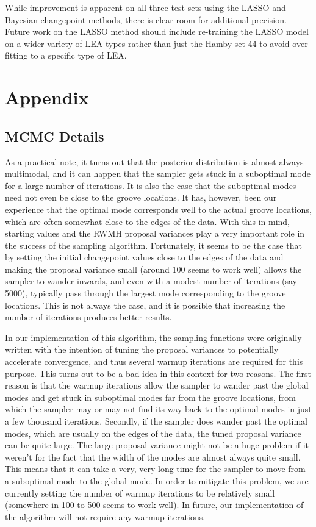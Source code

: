 \documentclass[12pt]{article}
\begin{document}
While improvement is apparent on all three test sets using the LASSO and
Bayesian changepoint methods, there is clear room for additional
precision. Future work on the LASSO method should include re-training
the LASSO model on a wider variety of LEA types rather than just the
Hamby set 44 to avoid over-fitting to a specific type of LEA.

\section{Appendix}

\subsection{MCMC Details}

As a practical note, it turns out that the posterior distribution is
almost always multimodal, and it can happen that the sampler gets stuck
in a suboptimal mode for a large number of iterations. It is also the
case that the suboptimal modes need not even be close to the groove
locations. It has, however, been our experience that the optimal mode
corresponds well to the actual groove locations, which are often
somewhat close to the edges of the data. With this in mind, starting
values and the RWMH proposal variances play a very important role in the
success of the sampling algorithm. Fortunately, it seems to be the case
that by setting the initial changepoint values close to the edges of the
data and making the proposal variance small (around 100 seems to work
well) allows the sampler to wander inwards, and even with a modest
number of iterations (say 5000), typically pass through the largest mode
corresponding to the groove locations. This is not always the case, and
it is possible that increasing the number of iterations produces better
results.

In our implementation of this algorithm, the sampling functions were
originally written with the intention of tuning the proposal variances
to potentially accelerate convergence, and thus several warmup
iterations are required for this purpose. This turns out to be a bad
idea in this context for two reasons. The first reason is that the
warmup iterations allow the sampler to wander past the global modes and
get stuck in suboptimal modes far from the groove locations, from which
the sampler may or may not find its way back to the optimal modes in
just a few thousand iterations. Secondly, if the sampler does wander
past the optimal modes, which are usually on the edges of the data, the
tuned proposal variance can be quite large. The large proposal variance
might not be a huge problem if it weren't for the fact that the width of
the modes are almost always quite small. This means that it can take a
very, very long time for the sampler to move from a suboptimal mode to
the global mode. In order to mitigate this problem, we are currently
setting the number of warmup iterations to be relatively small
(somewhere in 100 to 500 seems to work well). In future, our
implementation of the algorithm will not require any warmup iterations.
\end{document}
